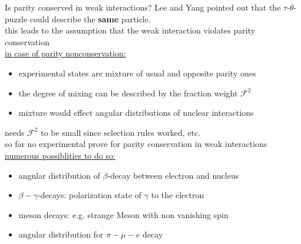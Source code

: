 \documentclass[aspectratio=1610, 10pt]{beamer}
\begin{document}
\begin{frame}{Is parity conserved in weak interactions?}
	Lee and Yang pointed out that the $\tau$-$\theta$-puzzle could describe the \textbf{same} particle. \cite{PhysRev.104.254}\\
	\textrightarrow this leads to the assumption that the weak interaction violates parity conservation\\
	\vspace{0.2cm}
	\underline{in case of parity nonconservation:}\\
	\begin{itemize}
		\item experimental states are mixture of usual and opposite parity ones
		\item the degree of mixing can be described by the fraction weight $\mathcal{F}^2$
		\item mixture would effect angular distributions of nuclear interactions
	\end{itemize}
	needs $\mathcal{F}^2$ to be small since selection rules worked, etc. \\
	\textrightarrow so far no experimental prove for parity conservation in weak interactions\\
	\vspace{0.2cm}
	\underline{numerous possiblities to do so:}
	\begin{itemize}
		\item angular distribution of $\beta$-decay between electron and nucleus
		\item $\beta-\gamma$-decays: polarization state of $\gamma$ to the electron
		\item meson decays: e.g. strange Meson with non vanishing spin
		\item angular distribution for $\pi-\mu-e$ decay
	\end{itemize}
\end{frame}
\end{document}
